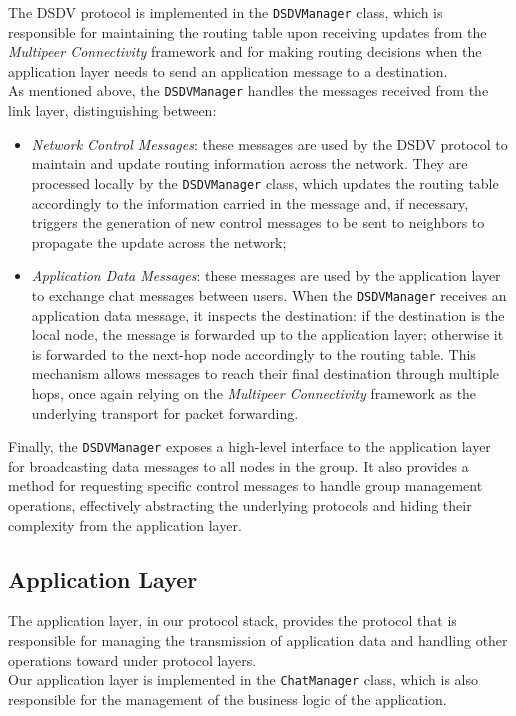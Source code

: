 \documentclass[conference]{IEEEtran}
\begin{document}
The DSDV protocol is implemented in the \texttt{DSDVManager} class, which is
responsible for maintaining the routing table upon receiving updates from the
\textit{Multipeer Connectivity} framework and for making routing decisions when
the application layer needs to send an application message to a destination. \\
As mentioned above, the \texttt{DSDVManager} handles the messages received from
the link layer, distinguishing between: \\
\begin{itemize}
    \item \textit{Network Control Messages}: these messages are used by the DSDV
    protocol to maintain and update routing information across the network. They
    are processed locally by the \texttt{DSDVManager} class, which updates the
    routing table accordingly to the information carried in the message and, if
    necessary, triggers the generation of new control messages to be sent to
    neighbors to propagate the update across the network;
    \item \textit{Application Data Messages}: these messages are used by the
    application layer to exchange chat messages between users. When the
    \texttt{DSDVManager} receives an application data message, it inspects the
    destination: if the destination is the local node, the message is 
    forwarded up to the application layer; otherwise it is forwarded to the
    next-hop node accordingly to the routing table. This mechanism allows
    messages to reach their final destination through multiple hops, once again
    relying on the \textit{Multipeer Connectivity} framework as the underlying
    transport for packet forwarding. 
\end{itemize} 

Finally, the \texttt{DSDVManager} exposes a high-level interface to the
application layer for broadcasting data messages to all nodes in the group. It
also provides a method for requesting specific control messages to handle group
management operations, effectively abstracting the underlying protocols and
hiding their complexity from the application layer. \\

\subsection{Application Layer}
The application layer, in our protocol stack, provides the protocol that is
responsible for managing the transmission of application data and handling other
operations toward under protocol layers. \\ 
Our application layer is implemented in the \texttt{ChatManager} class, which is
also responsible for the management of the business logic of the application.\\
\end{document}
